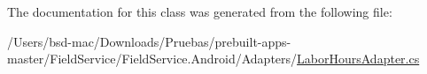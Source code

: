 The documentation for this class was generated from the following file\+:\begin{DoxyCompactItemize}
\item 
/\+Users/bsd-\/mac/\+Downloads/\+Pruebas/prebuilt-\/apps-\/master/\+Field\+Service/\+Field\+Service.\+Android/\+Adapters/\hyperlink{_labor_hours_adapter_8cs}{Labor\+Hours\+Adapter.\+cs}\end{DoxyCompactItemize}
